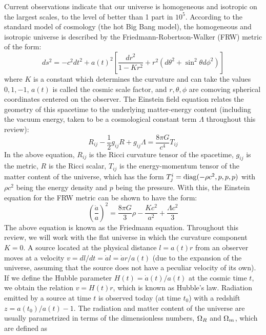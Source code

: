 Current observations indicate that our universe is homogeneous and isotropic on the largest scales, to the level of better than 1 part in $10^5$. 
According to the standard model of cosmology (the hot Big Bang model), the homogeneous and isotropic universe is described by the Friedmann-Robertson-Walker (FRW) metric of the form:
\begin{equation}
ds^2 = -c^2 dt^2 + a(t)^2 \left[\frac{dr^2}{1 - Kr^2} + r^2(d \theta^2 + \sin^2 \theta d \phi^2)\right]                                                                                  \end{equation} 
where $K$ is a constant which determines the curvature and can take the values $0, 1, -1$, $a(t)$ is called the cosmic scale factor, and $r, \theta, \phi$ are comoving spherical coordinates centered on the observer. The Einstein field equation relates the geometry of this spacetime to the underlying matter-energy content (including the vacuum energy, taken to be a cosmological constant term $\Lambda$ throughout this review):
\begin{equation}
 R_{ij} - \frac{1}{2} g_{ij} R + g_{ij} \Lambda = \frac{8 \pi G}{c^4} T_{ij}
\end{equation} 
In the above equation, $R_{ij}$ is the Ricci curvature tensor of the spacetime, $g_{ij}$ is the metric, $R$ is the Ricci scalar,  $T_{ij}$ is the energy-momentum tensor of the matter content of the universe, which has the form $T^i_j = {\rm diag}(-\rho c^2, p, p, p)$ with $\rho c^2$ being the energy density and $p$ being the pressure.  With this, 
 the Einstein equation for the FRW metric can be shown to have the form:
 \begin{equation}
 \left( \frac{\dot{a}}{a} \right)^2 = \frac{8 \pi G}{3} \rho - \frac{K c^2}{a^2} + \frac{\Lambda c^2}{3}
 \end{equation} 
 The above equation is known as the Friedmann equation. 
 Throughout this review,  we will work with the flat universe in which the curvature component $K = 0$.
 A source located at the physical distance $l = a(t) r$ from an observer moves at a velocity  $v = dl/dt = \dot{a} l = \dot{a} r/a(t)$ (due to the expansion of the universe, assuming that the source does not have a peculiar velocity of its own). If we define 
 the Hubble parameter $H(t) = \dot{a} (t)/ a(t)$ at the cosmic time $t$, we  obtain the relation $v = H(t) r$, which is known as Hubble's law. Radiation emitted by a source at time $t$ is observed today (at time $t_0$) with a redshift $z = a(t_0)/a(t) - 1$.
 The radiation and matter content of the universe are usually parametrized in terms of the dimensionless numbers, ${\Omega_R}$ and ${\Omega_m}$, which are defined as
